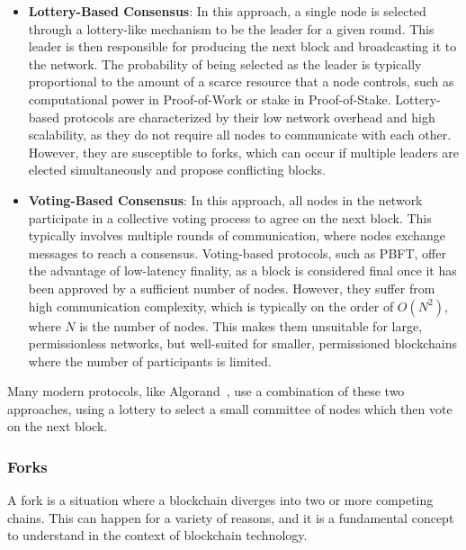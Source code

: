 \begin{itemize}
	\item
	\textbf{Lottery-Based Consensus}: In this approach, a single node is
	selected through a lottery-like mechanism to be the leader for a given
	round. This leader is then responsible for producing the next block
	and broadcasting it to the network. The probability of being selected
	as the leader is typically proportional to the amount of a scarce
	resource that a node controls, such as computational power in
	Proof-of-Work or stake in Proof-of-Stake. Lottery-based protocols are
	characterized by their low network overhead and high scalability, as
	they do not require all nodes to communicate with each other. However,
	they are susceptible to forks, which can occur if multiple leaders are
	elected simultaneously and propose conflicting blocks.
	\item
	\textbf{Voting-Based Consensus}: In this approach, all nodes in the
	network participate in a collective voting process to agree on the
	next block. This typically involves multiple rounds of communication,
	where nodes exchange messages to reach a consensus. Voting-based
	protocols, such as PBFT, offer the advantage of low-latency finality,
	as a block is considered final once it has been approved by a
	sufficient number of nodes. However, they suffer from high
	communication complexity, which is typically on the order of
	$O(N^2)$, where $N$ is the number of nodes. This makes them unsuitable
	for large, permissionless networks, but well-suited for smaller,
	permissioned blockchains where the number of participants is limited.
\end{itemize}

Many modern protocols, like Algorand~\cite{gilad2017algorand}, use a combination of these two
approaches, using a lottery to select a small committee of nodes which
then vote on the next block.

\subsubsection{Forks}\label{forks}

A fork is a situation where a blockchain diverges into two or more
competing chains. This can happen for a variety of reasons, and it is a
fundamental concept to understand in the context of blockchain
technology.

